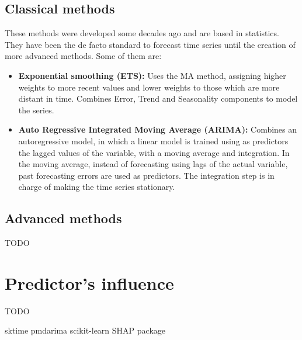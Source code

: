 \subsection{Classical methods}
These methods were developed some decades ago and are based in statistics. They have been the de facto standard to forecast time series until the creation of more advanced methods. Some of them are: \cite{lazzeri2020machine, hyndman2018forecasting}
\begin{itemize}
    \item \textbf{Exponential smoothing (ETS):} Uses the MA method, assigning higher weights to more recent values and lower weights to those which are more distant in time. Combines Error, Trend and Seasonality components to model the series.
    \item \textbf{Auto Regressive Integrated Moving Average (ARIMA):} Combines an autoregressive model, in which a linear model is trained using as predictors the lagged values of the variable, with a moving average and integration. In the moving average, instead of forecasting using lags of the actual variable, past forecasting errors are used as predictors. The integration step is in charge of making the time series stationary.
\end{itemize}

\subsection{Advanced methods}
TODO

\section{Predictor's influence}
%
TODO




sktime \cite{DBLP:journals/corr/abs-1909-07872}
pmdarima \cite{pmdarima}
scikit-learn \cite{scikit-learn}
SHAP package \cite{shap-package}
